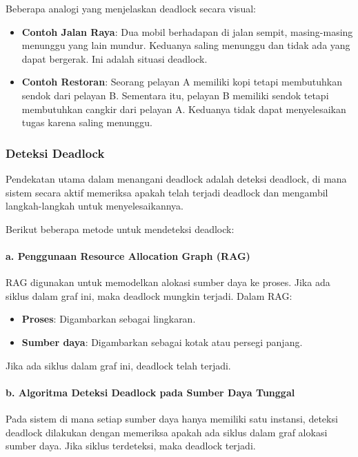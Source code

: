 \documentclass[12pt]{article}
\begin{document}
Beberapa analogi yang menjelaskan deadlock secara visual:

\begin{itemize}
    \item \textbf{Contoh Jalan Raya}: Dua mobil berhadapan di jalan sempit, masing-masing menunggu yang lain mundur. Keduanya saling menunggu dan tidak ada yang dapat bergerak. Ini adalah situasi deadlock.
    \item \textbf{Contoh Restoran}: Seorang pelayan A memiliki kopi tetapi membutuhkan sendok dari pelayan B. Sementara itu, pelayan B memiliki sendok tetapi membutuhkan cangkir dari pelayan A. Keduanya tidak dapat menyelesaikan tugas karena saling menunggu.
\end{itemize}

\subsubsection{Deteksi Deadlock}

Pendekatan utama dalam menangani deadlock adalah deteksi deadlock, di mana sistem secara aktif memeriksa apakah telah terjadi deadlock dan mengambil langkah-langkah untuk menyelesaikannya.

Berikut beberapa metode untuk mendeteksi deadlock:

\paragraph{a. Penggunaan Resource Allocation Graph (RAG)}

RAG digunakan untuk memodelkan alokasi sumber daya ke proses. Jika ada siklus dalam graf ini, maka deadlock mungkin terjadi. Dalam RAG:

\begin{itemize}
    \item \textbf{Proses}: Digambarkan sebagai lingkaran.
    \item \textbf{Sumber daya}: Digambarkan sebagai kotak atau persegi panjang.
\end{itemize}

Jika ada siklus dalam graf ini, deadlock telah terjadi.

\paragraph{b. Algoritma Deteksi Deadlock pada Sumber Daya Tunggal}

Pada sistem di mana setiap sumber daya hanya memiliki satu instansi, deteksi deadlock dilakukan dengan memeriksa apakah ada siklus dalam graf alokasi sumber daya. Jika siklus terdeteksi, maka deadlock terjadi.
\end{document}
